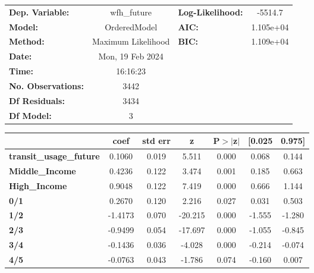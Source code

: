 \documentclass{report}
\begin{document}
\begin{center}
\begin{tabular}{lclc}
\toprule
\textbf{Dep. Variable:}         &    wfh\_future     & \textbf{  Log-Likelihood:    } &   -5514.7   \\
\textbf{Model:}                 &    OrderedModel    & \textbf{  AIC:               } & 1.105e+04   \\
\textbf{Method:}                & Maximum Likelihood & \textbf{  BIC:               } & 1.109e+04   \\
\textbf{Date:}                  &  Mon, 19 Feb 2024  & \textbf{                     } &             \\
\textbf{Time:}                  &      16:16:23      & \textbf{                     } &             \\
\textbf{No. Observations:}      &         3442       & \textbf{                     } &             \\
\textbf{Df Residuals:}          &         3434       & \textbf{                     } &             \\
\textbf{Df Model:}              &            3       & \textbf{                     } &             \\
\bottomrule
\end{tabular}
\begin{tabular}{lcccccc}
                                & \textbf{coef} & \textbf{std err} & \textbf{z} & \textbf{P$> |$z$|$} & \textbf{[0.025} & \textbf{0.975]}  \\
\midrule
\textbf{transit\_usage\_future} &       0.1060  &        0.019     &     5.511  &         0.000        &        0.068    &        0.144     \\
\textbf{Middle\_Income}         &       0.4236  &        0.122     &     3.474  &         0.001        &        0.185    &        0.663     \\
\textbf{High\_Income}           &       0.9048  &        0.122     &     7.419  &         0.000        &        0.666    &        1.144     \\
\textbf{0/1}                    &       0.2670  &        0.120     &     2.216  &         0.027        &        0.031    &        0.503     \\
\textbf{1/2}                    &      -1.4173  &        0.070     &   -20.215  &         0.000        &       -1.555    &       -1.280     \\
\textbf{2/3}                    &      -0.9499  &        0.054     &   -17.697  &         0.000        &       -1.055    &       -0.845     \\
\textbf{3/4}                    &      -0.1436  &        0.036     &    -4.028  &         0.000        &       -0.214    &       -0.074     \\
\textbf{4/5}                    &      -0.0763  &        0.043     &    -1.786  &         0.074        &       -0.160    &        0.007     \\
\bottomrule
\end{tabular}
\end{center}
\end{document}
